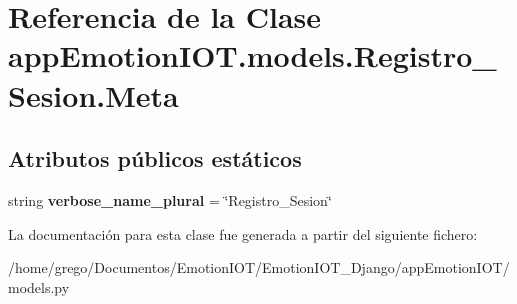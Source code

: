 \hypertarget{classappEmotionIOT_1_1models_1_1Registro__Sesion_1_1Meta}{}\section{Referencia de la Clase app\+Emotion\+I\+O\+T.\+models.\+Registro\+\_\+\+Sesion.\+Meta}
\label{classappEmotionIOT_1_1models_1_1Registro__Sesion_1_1Meta}
\subsection*{Atributos públicos estáticos}
\begin{DoxyCompactItemize}
\item 
string {\bfseries verbose\+\_\+name\+\_\+plural} = \char`\"{}Registro\+\_\+\+Sesion\char`\"{}\hypertarget{classappEmotionIOT_1_1models_1_1Registro__Sesion_1_1Meta_aefc62b81cf0f86cf8cdf587bb7bea5ae}{}\label{classappEmotionIOT_1_1models_1_1Registro__Sesion_1_1Meta_aefc62b81cf0f86cf8cdf587bb7bea5ae}

\end{DoxyCompactItemize}


La documentación para esta clase fue generada a partir del siguiente fichero\+:\begin{DoxyCompactItemize}
\item 
/home/grego/\+Documentos/\+Emotion\+I\+O\+T/\+Emotion\+I\+O\+T\+\_\+\+Django/app\+Emotion\+I\+O\+T/models.\+py\end{DoxyCompactItemize}
